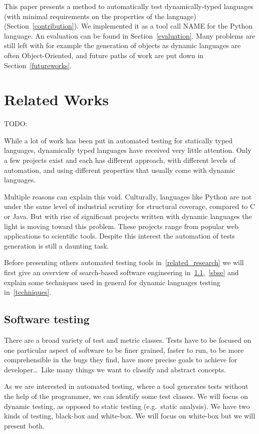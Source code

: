 \documentclass{llncs2e/llncs}
\def\todo#1{{\color{red}TODO:\quad#1}}
\begin{document}
This paper presents a method to automatically test dynamically-typed languages
(with minimal requirements on the properties of the language)
(Section~\ref{contribution}). We implemented it as a tool call NAME for the
Python language. An evaluation can be found in Section~\ref{evaluation}. Many
problems are still left with for example the generation of objects as dynamic
languages are often Object-Oriented, and future paths of work are put down in
Section~\ref{futureworks}.


\section{Related Works}
\label{relatedwork}
\todo{}

While a lot of work has been put in automated testing for statically typed
languages, dynamically typed languages have received very little attention. Only
a few projects exist and each has different approach, with different levels of
automation, and using different properties that usually come with dynamic
languages.

Multiple reasons can explain this void. Culturally, languages like Python are
not under the same level of industrial scrutiny for structural coverage,
compared to C or Java. But with rise of significant projects written with
dynamic languages the light is moving toward this problem. These projects range
from popular web applications to scientific tools. Despite this interest the
automation of tests generation is still a daunting task.

Before presenting others automated testing tools in~\ref{related_research} we
will first give an overview of search-based software engineering in~\ref{st},~\ref{sbse}
and explain some techniques used in general for dynamic languages testing
in~\ref{techniques}.

\subsection{Software testing}
\label{st}

There are a broad variety of test and metric classes. Tests have to be focused
on one particular aspect of software to be finer grained, faster to run, to be
more comprehensible in the bugs they find, have more precise goals to achieve
for developer\dots\ Like many things we want to classify and abstract concepts.

As we are interested in automated testing, where a tool generates tests without
the help of the programmer, we can identify some test classes. We will focus on
dynamic testing, as opposed to static testing (e.g.\ static analysis). We have
two kinds of testing, black-box and white-box. We will focus on white-box but we
will present both.
\end{document}
